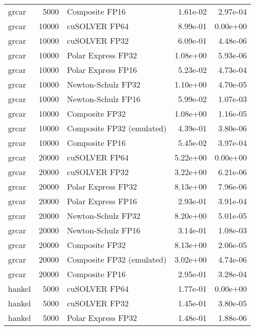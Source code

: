\begin{table}
\begin{tabular}{lrlrr}
    grcar &  5000 &            Composite FP16 &  1.61e-02 &        2.97e-04 \\
    grcar & 10000 &             cuSOLVER FP64 &  8.99e-01 &        0.00e+00 \\
    grcar & 10000 &             cuSOLVER FP32 &  6.09e-01 &        4.48e-06 \\
    grcar & 10000 &        Polar Express FP32 &  1.08e+00 &        5.93e-06 \\
    grcar & 10000 &        Polar Express FP16 &  5.23e-02 &        4.73e-04 \\
    grcar & 10000 &        Newton-Schulz FP32 &  1.10e+00 &        4.70e-05 \\
    grcar & 10000 &        Newton-Schulz FP16 &  5.99e-02 &        1.07e-03 \\
    grcar & 10000 &            Composite FP32 &  1.08e+00 &        1.16e-05 \\
    grcar & 10000 & Composite FP32 (emulated) &  4.39e-01 &        3.80e-06 \\
    grcar & 10000 &            Composite FP16 &  5.45e-02 &        3.97e-04 \\
    grcar & 20000 &             cuSOLVER FP64 &  5.22e+00 &        0.00e+00 \\
    grcar & 20000 &             cuSOLVER FP32 &  3.22e+00 &        6.21e-06 \\
    grcar & 20000 &        Polar Express FP32 &  8.13e+00 &        7.96e-06 \\
    grcar & 20000 &        Polar Express FP16 &  2.93e-01 &        3.91e-04 \\
    grcar & 20000 &        Newton-Schulz FP32 &  8.20e+00 &        5.01e-05 \\
    grcar & 20000 &        Newton-Schulz FP16 &  3.14e-01 &        1.08e-03 \\
    grcar & 20000 &            Composite FP32 &  8.13e+00 &        2.06e-05 \\
    grcar & 20000 & Composite FP32 (emulated) &  3.02e+00 &        4.74e-06 \\
    grcar & 20000 &            Composite FP16 &  2.95e-01 &        3.28e-04 \\
   hankel &  5000 &             cuSOLVER FP64 &  1.77e-01 &        0.00e+00 \\
   hankel &  5000 &             cuSOLVER FP32 &  1.45e-01 &        3.80e-05 \\
   hankel &  5000 &        Polar Express FP32 &  1.48e-01 &        1.88e-06 \\

\end{tabular}
\end{table}
